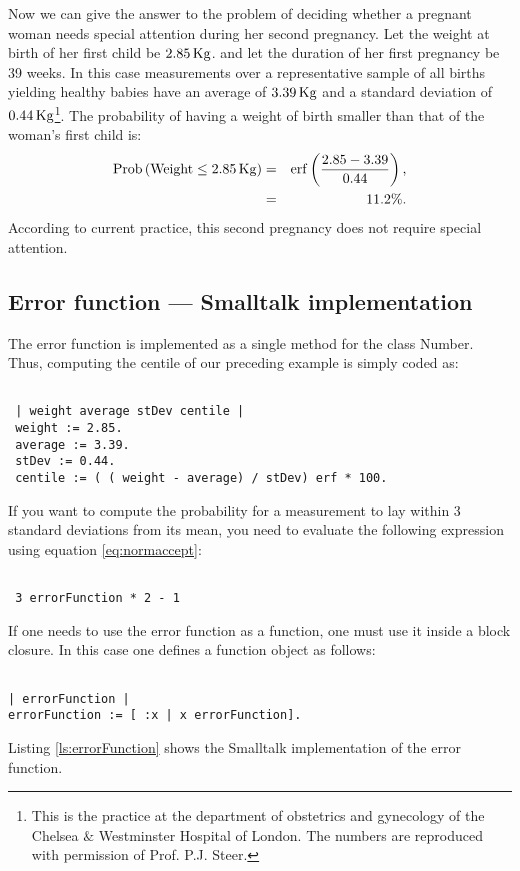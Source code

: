 \documentclass[twoside]{book}
\begin{document}
\def\w{2.85}\def\av{3.39}\def\st{0.44}
 Now we can give the answer to the problem of deciding
whether a pregnant woman needs special attention during her second
pregnancy. Let the weight at birth of her first child be $\w\kg$.
and let the duration of her first pregnancy be 39 weeks. In this
case measurements over a representative sample of all births
yielding healthy babies have an average of $\av\kg$ and a standard
deviation of $\st\kg$\footnote{\label{ft:steer}This is the
practice at the department of obstetrics and gynecology of the
Chelsea $\&$ Westminster Hospital of London. The numbers are
reproduced with permission of Prof. P.J. Steer.}. The probability
of having a weight of birth smaller than that of the woman's first
child is:
\begin{eqnarray*}
\prob\left(\mathop{\rm Weight}\le \w\kg \right) & = &
\erf\left({\w-\av\over\st}\right),\\ & = & 11.2\%.
\end{eqnarray*}
According to current practice, this second pregnancy does not
require special attention.

\subsection{Error function --- Smalltalk implementation}
\label{sec:sterrorfunction}  The error function is
implemented as a single method for the class Number. Thus,
computing the centile of our preceding example is simply coded as:
\begin{codeExample}
\begin{verbatim}

 | weight average stDev centile |
 weight := 2.85.
 average := 3.39.
 stDev := 0.44.
 centile := ( ( weight - average) / stDev) erf * 100.
\end{verbatim}
\end{codeExample}
If you want to compute the probability for a measurement to lay
within 3 standard deviations from its mean, you need to evaluate
the following expression using equation \ref{eq:normaccept}:
\begin{codeExample}
\begin{verbatim}

 3 errorFunction * 2 - 1
\end{verbatim}
\end{codeExample}
If one needs to use the error function as a function, one must use
it inside a block closure. In this case one defines a function
object as follows:
\begin{codeExample}
\begin{verbatim}

| errorFunction |
errorFunction := [ :x | x errorFunction].
\end{verbatim}
\end{codeExample}
Listing \ref{ls:errorFunction} shows the Smalltalk implementation
of the error function.
\end{document}
